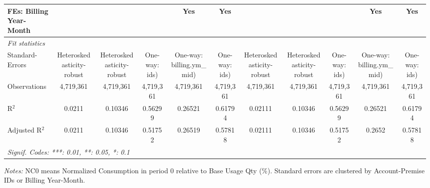 \begin{table}[htbp]
\begin{tabular}{lcccccccccc}
FEs: Billing Year-Month &  &  &  & Yes & Yes &  &  &  & Yes & Yes\\
\midrule
\emph{Fit statistics}&  & & & & & & & & & \\
Standard-Errors& Heteroskedasticity-robust&Heteroskedasticity-robust&One-way: ids)&One-way: billing.ym\_mid)&One-way: ids)&Heteroskedasticity-robust&Heteroskedasticity-robust&One-way: ids)&One-way: billing.ym\_mid)&One-way: ids)\\
Observations & 4,719,361&4,719,361&4,719,361&4,719,361&4,719,361&4,719,361&4,719,361&4,719,361&4,719,361&4,719,361\\
R$^2$ & 0.0211&0.10346&0.56299&0.26521&0.61794&0.02111&0.10346&0.56299&0.26521&0.61794\\
Adjusted R$^2$ & 0.0211&0.10346&0.51752&0.26519&0.57818&0.02111&0.10346&0.51752&0.2652&0.57818\\
\bottomrule\bottomrule
\multicolumn{11}{l}{\emph{Signif. Codes: ***: 0.01, **: 0.05, *: 0.1}}\\
\end{tabular}

\emph{\medskip Notes:} NC0 means Normalized Consumption in period 0 relative to Base Usage Qty (\%). Standard errors are clustered by Account-Premise IDs or Billing Year-Month.
\end{table}